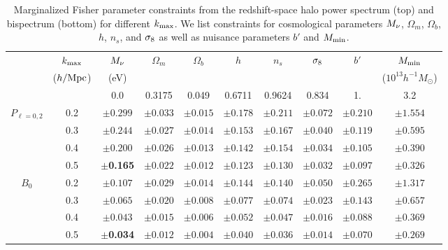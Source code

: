 \begin{table}
    \caption{Marginalized Fisher parameter constraints from the redshift-space halo power 
    spectrum (top) and bispectrum (bottom) for different $k_{\rm max}$. We list 
    constraints for cosmological parameters $M_\nu$, $\Omega_m$, $\Omega_b$, $h$, $n_s$, 
    and $\sigma_8$ as well as nuisance parameters $b'$ and $M_{\rm min}$.} 
\begin{center} 
    \begin{tabular}{cccccccccc} \toprule
         & $k_{\rm max}$ & $M_\nu$ & $\Omega_m$ & $\Omega_b$ & $h$ & $n_s$ & $\sigma_8$ & $b'$ & $M_{\rm min}$ \\
         & ({\footnotesize $h/{\rm Mpc}$}) &({\footnotesize eV}) & & & & & & & ({\footnotesize $10^{13} h^{-1}M_\odot$}) \\[3pt] \hline\hline

            &     & 0.0 & 0.3175 & 0.049 & 0.6711 & 0.9624 & 0.834 & 1. & 3.2  \\ 
$P_{\ell=0,2}$  & 0.2 &$\pm0.299$ & $\pm0.033$ & $\pm0.015$ & $\pm0.178$ & $\pm0.211$ & $\pm0.072$ & $\pm0.210$ & $\pm1.554$\\
            & 0.3 &$\pm0.244$ & $\pm0.027$ & $\pm0.014$ & $\pm0.153$ & $\pm0.167$ & $\pm0.040$ & $\pm0.119$ & $\pm0.595$\\
            & 0.4 &$\pm0.200$ & $\pm0.026$ & $\pm0.013$ & $\pm0.142$ & $\pm0.154$ & $\pm0.034$ & $\pm0.105$ & $\pm0.390$\\
       & 0.5 &$\pm${\bf 0.165}& $\pm0.022$ & $\pm0.012$ & $\pm0.123$ & $\pm0.130$ & $\pm0.032$ & $\pm0.097$ & $\pm0.326$\\\hline
                   
    $B_0$  & 0.2 &$\pm0.107$ & $\pm0.029$ & $\pm0.014$ & $\pm0.144$ & $\pm0.140$ & $\pm0.050$ & $\pm0.265$ & $\pm1.317$\\
           & 0.3 &$\pm0.065$ & $\pm0.020$ & $\pm0.008$ & $\pm0.077$ & $\pm0.074$ & $\pm0.023$ & $\pm0.143$ & $\pm0.657$\\
           & 0.4 &$\pm0.043$ & $\pm0.015$ & $\pm0.006$ & $\pm0.052$ & $\pm0.047$ & $\pm0.016$ & $\pm0.088$ & $\pm0.369$\\
           & 0.5 &$\pm${\bf 0.034}& $\pm0.012$ & $\pm0.004$ & $\pm0.040$ & $\pm0.036$ & $\pm0.014$ & $\pm0.070$ & $\pm0.269$\\[3pt]

    \hline
\end{tabular} \label{tab:forecast}
\end{center}
\end{table}

